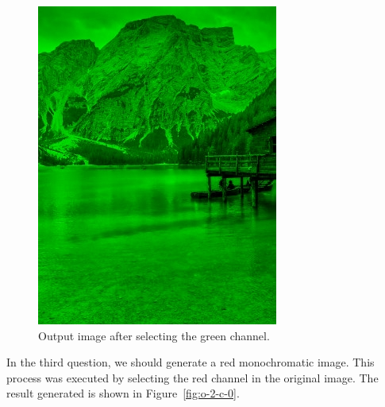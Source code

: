 \documentclass[]{IEEEtran}
\begin{document}
  \begin{figure}[!h]
    \centering
    \includegraphics[width=0.8\hsize]{../output/o-2-b-0.jpg}
    \caption{Output image after selecting the green channel.}
    \label{fig:o-2-b-0}
  \end{figure}
  
  In the third question, we should generate a red monochromatic image. This process was executed by selecting the red channel in the original image. The result generated is shown in Figure~\ref{fig:o-2-c-0}.
  
\end{document}
